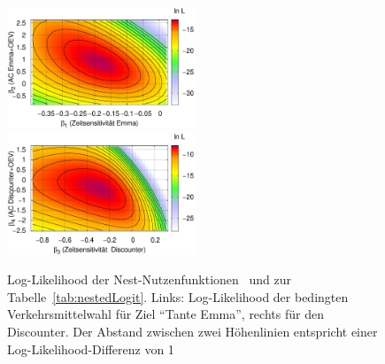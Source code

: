 \begin{figure}
\includegraphics[width=0.5\textwidth]
  {figsDiscr/NL_Skript_2x2alt.Nest1_lnL_beta0_beta1.eps}
\includegraphics[width=0.5\textwidth]
  {figsDiscr/NL_Skript_2x2alt.Nest2_lnL_beta0_beta1.eps}
\caption{\label{fig:nestedLogit-logL}Log-Likelihood der
  Nest-Nutzenfunktionen~ und  
zur Tabelle~\ref{tab:nestedLogit}.
Links: Log-Likelihood der bedingten Verkehrsmittelwahl f\"ur Ziel
``Tante Emma'', rechts f\"ur den Discounter.
 Der Abstand zwischen zwei
H\"ohenlinien entspricht einer Log-Likelihood-Differenz von 1
}
\end{figure}

